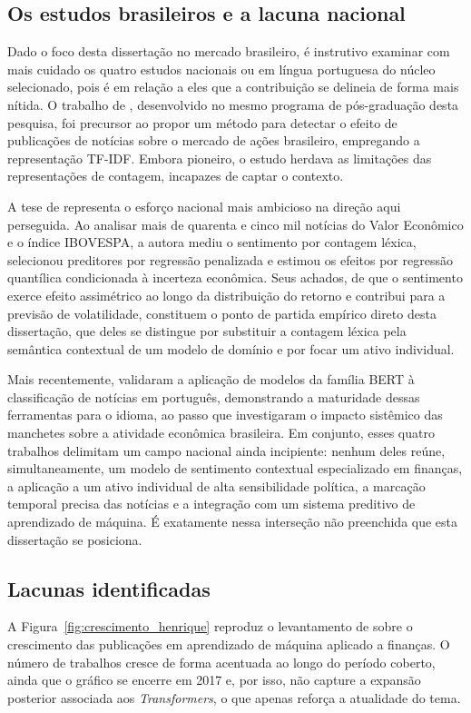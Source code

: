 \subsection{Os estudos brasileiros e a lacuna nacional}

Dado o foco desta dissertação no mercado brasileiro, é instrutivo examinar com mais cuidado os quatro estudos nacionais ou em língua portuguesa do núcleo selecionado, pois é em relação a eles que a contribuição se delineia de forma mais nítida. O trabalho de , desenvolvido no mesmo programa de pós-graduação desta pesquisa, foi precursor ao propor um método para detectar o efeito de publicações de notícias sobre o mercado de ações brasileiro, empregando a representação TF-IDF. Embora pioneiro, o estudo herdava as limitações das representações de contagem, incapazes de captar o contexto.

A tese de  representa o esforço nacional mais ambicioso na direção aqui perseguida. Ao analisar mais de quarenta e cinco mil notícias do Valor Econômico e o índice IBOVESPA, a autora mediu o sentimento por contagem léxica, selecionou preditores por regressão penalizada e estimou os efeitos por regressão quantílica condicionada à incerteza econômica. Seus achados, de que o sentimento exerce efeito assimétrico ao longo da distribuição do retorno e contribui para a previsão de volatilidade, constituem o ponto de partida empírico direto desta dissertação, que deles se distingue por substituir a contagem léxica pela semântica contextual de um modelo de domínio e por focar um ativo individual.

Mais recentemente,  validaram a aplicação de modelos da família BERT à classificação de notícias em português, demonstrando a maturidade dessas ferramentas para o idioma, ao passo que  investigaram o impacto sistêmico das manchetes sobre a atividade econômica brasileira. Em conjunto, esses quatro trabalhos delimitam um campo nacional ainda incipiente: nenhum deles reúne, simultaneamente, um modelo de sentimento contextual especializado em finanças, a aplicação a um ativo individual de alta sensibilidade política, a marcação temporal precisa das notícias e a integração com um sistema preditivo de aprendizado de máquina. É exatamente nessa interseção não preenchida que esta dissertação se posiciona.

\subsection{Lacunas identificadas}
A Figura~\ref{fig:crescimento_henrique} reproduz o levantamento de  sobre o crescimento das publicações em aprendizado de máquina aplicado a finanças. O número de trabalhos cresce de forma acentuada ao longo do período coberto, ainda que o gráfico se encerre em 2017 e, por isso, não capture a expansão posterior associada aos \textit{Transformers}, o que apenas reforça a atualidade do tema.

